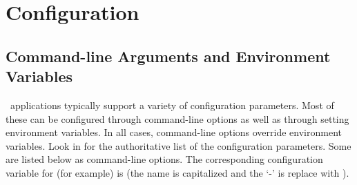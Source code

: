 %
%
%
\section{Configuration}


\subsection{Command-line Arguments and Environment Variables}
\label{subsect:config}
\ensemble\ applications typically support a variety of configuration
parameters.  Most of these can be configured through command-line options as
well as through setting environment variables.  In all cases, command-line
options override environment variables.  Look in  for the
authoritative list of the configuration parameters.  Some are listed below as
command-line options.  The corresponding configuration variable for
 (for example) is  (the name is
capitalized and the `-' is replace with ).

